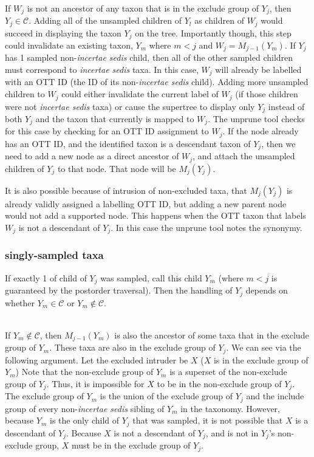 \documentclass[english]{article}
\newcommand{\incsed}[0]{{\em incertae sedis}\xspace}
\begin{document}
\\
If $W_j$ is not an ancestor of any taxon that is in the exclude group of $Y_j$, then $Y_j\in\mathcal{C}$.
Adding all of the unsampled children of $Y_l$ as children of $W_j$ would succeed in displaying
    the taxon $Y_j$ on the tree.
Importantly though, this step could invalidate an existing taxon, $Y_m$ where $m < j$ and $W_j = M_{j-1}(Y_m)$.
If $Y_j$ has 1 sampled non-\incsed child, then all of the other sampled children must correspond to \incsed taxa.
In this case, $W_j$ will already be labelled with an OTT ID (the ID of its non-\incsed child).
Adding more unsampled children to $W_j$ could either invalidate the current label of
    $W_j$ (if those children were not \incsed taxa) or cause the supertree
    to display only $Y_j$ instead of both $Y_j$ and the taxon that currently is mapped to $W_j$.
The unprune tool checks for this case by checking for an OTT ID assignment to $W_j$.
If the node already has an OTT ID, and the identified taxon is a descendant taxon of $Y_j$, 
then we need to add a new node as a direct ancestor of $W_j$, and attach the unsampled 
children of $Y_j$ to that node.
That node will be $M_j(Y_j)$.

It is also possible because of intrusion of non-excluded taxa, that $M_j(Y_j)$ is already 
validly assigned a labelling OTT ID, but adding a new parent node would not add a supported
node.
This happens when the OTT taxon that labels $W_j$ is not a descendant of $Y_j$.
In this case the unprune tool notes the synonymy.



\subsubsection{singly-sampled taxa}
If exactly 1 of child of $Y_j$ was sampled, call this child $Y_m$ (where $m < j$ 
    is guaranteed by the postorder traversal).
Then the handling of $Y_j$ depends on 
    whether $Y_m\in\mathcal{C}$ or $Y_m\notin\mathcal{C}$.

\\
If $Y_m\notin\mathcal{C}$, then $M_{j-1}(Y_m)$ is also the ancestor
    of some taxa that in the exclude group of $Y_m$.
These taxa are also in the exclude group of $Y_j$.
We can see via the following argument.
Let the excluded intruder be $X$ ($X$ is in the exclude group of $Y_m$)
Note that the non-exclude group of $Y_m$ is a superset of the non-exclude group
    of $Y_j$.
Thus, it is impossible for $X$ to be in the non-exclude group of $Y_j$.
The exclude group of $Y_m$ is the union of the exclude group of $Y_j$ and the include
    group of every non-\incsed sibling of $Y_m$ in the taxonomy.
However, because $Y_m$ is the only child of $Y_j$ that was sampled, it is 
    not possible that $X$ is a descendant of $Y_j$.
Because $X$ is not a descendant of $Y_j$, and is not in $Y_j$'s non-exclude group,
    $X$ must be in the exclude group of $Y_j$.
\end{document}

